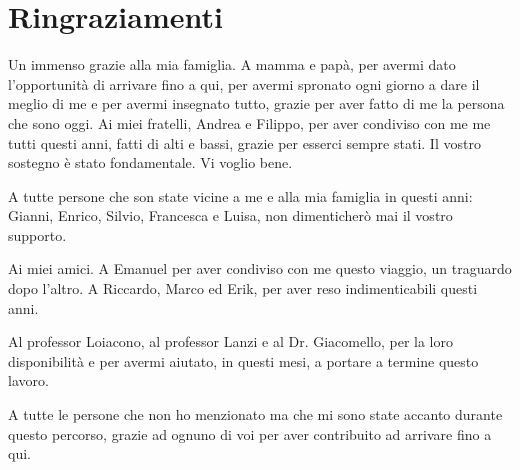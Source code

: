 \chapter*{Ringraziamenti}
\label{cha:ringraziamenti}
\doublespacing
\noindent Un immenso grazie alla mia famiglia. A mamma e papà, per avermi dato l'opportunità di arrivare fino a qui, per avermi spronato ogni giorno a dare il meglio di me e per avermi insegnato tutto, grazie per aver fatto di me la persona che sono oggi. Ai miei fratelli, Andrea e Filippo, per aver condiviso con me me tutti questi anni, fatti di alti e bassi, grazie per esserci sempre stati. Il vostro sostegno è stato fondamentale. Vi voglio bene.

\vspace{5mm}

\noindent A tutte persone che son state vicine a me e alla mia famiglia in questi anni: Gianni, Enrico, Silvio, Francesca e Luisa, non dimenticherò mai il vostro supporto.

\vspace{5mm}

\noindent Ai miei amici. A Emanuel per aver condiviso con me questo viaggio, un traguardo dopo l'altro. A Riccardo, Marco ed Erik, per aver reso indimenticabili questi anni. 

\vspace{5mm}

\noindent Al professor Loiacono, al professor Lanzi e al Dr. Giacomello, per la loro disponibilità e per avermi aiutato, in questi mesi, a portare a termine questo lavoro.

\vspace{5mm}

\noindent A tutte le persone che non ho menzionato ma che mi sono state accanto durante questo percorso, grazie ad ognuno di voi per aver contribuito ad arrivare fino a qui.